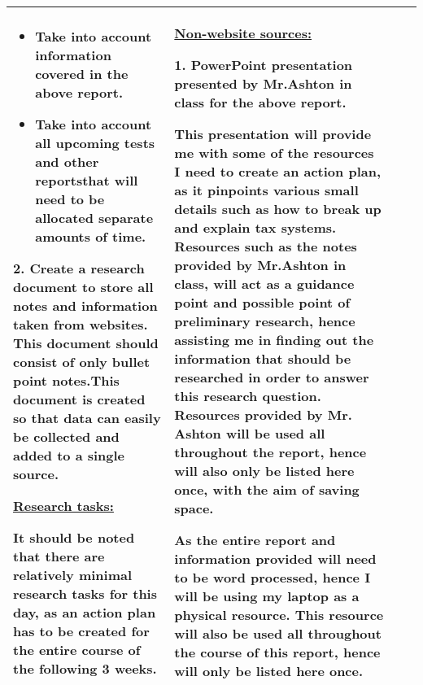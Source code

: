 \documentclass[12pt, a4paper]{article}
\begin{document}
\begin{landscape}
\begin{longtable}{|m{5cm}|m{5cm}|m{5cm}|m{10.31cm}|}
{			\begin{itemize}
				\item Take into account information covered in the above report.				
				\item Take into account all upcoming tests and other reportsthat will need to be allocated separate amounts of time.
			\end{itemize}
			
			2. Create a research document to store all notes and information taken from websites. This document should consist of only bullet point notes.This document is created so that data can easily be collected and added to a single source. \newline
			
			\textbf{\underline{Research tasks:}}
			
			It should be noted that there are relatively minimal research tasks for this day, as an action plan has to be created for the entire course of the following 3 weeks.
			\newline
			
			} 
		
			&
			
			\underline{\textbf{Non-website sources:}}
			\newline
			
			1. PowerPoint presentation presented by Mr.Ashton in class for the above report.
			\newline
			
			This presentation will provide me with some of the  resources I need to create an action plan, as it pinpoints various small details such as how to break up and explain tax systems. Resources such as the notes provided by Mr.Ashton in class, will act as a guidance point and possible point of preliminary research, hence assisting me in finding out the information that should be researched in order to answer this research question. Resources provided by Mr. Ashton will be used all throughout the report, hence will also only be listed here once, with the aim of saving space.
			\newline
			
			As the entire report and information provided will need to be word processed, hence I will be using my laptop as a physical resource. This resource will also be used all throughout the course of this report, hence will only be listed here once.\\
			\hline
			
			

\end{longtable}
\end{landscape}
\end{document}
